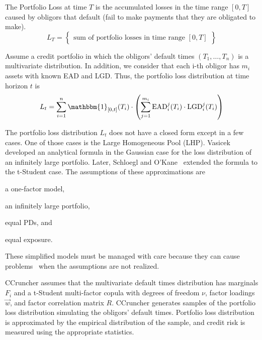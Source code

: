 \documentclass[11pt,fleqn]{book} %
\begin{document}
\begin{definition}
	The Portfolio Loss at time $T$ is the accumulated losses in the time 
	range $[0,T]$ caused by obligors that default (fail to make payments 
	that they are obligated to make).
	\begin{displaymath}
		L_T = \left\{
		\begin{array}{c}
			\text{sum of portfolio losses in time range $[0,T]$}
		\end{array}
		\right\}
	\end{displaymath}
\end{definition}

Assume a credit portfolio in which the obligors' default times 
$(T_1,\dots,T_n)$ is a multivariate distribution. In addition, we consider 
that each i-th obligor has $m_i$ assets with known EAD and LGD\@. Thus, 
the portfolio loss distribution at time horizon $t$ is
\begin{displaymath}
	L_t = \displaystyle \sum_{i=1}^n \mathbbm{1}_{[0,t]}(T_i) \cdot 
	\left( 
	\sum_{j=1}^{m_i} \text{EAD}_i^j(T_i) \cdot \text{LGD}_i^j(T_i)
	\right)
\end{displaymath}

The portfolio loss distribution $L_t$ does not have a closed form except 
in a few cases. One of those cases is the Large Homogeneous Pool (LHP).
Vasicek~\cite{vasicek:1987} developed an analytical formula in the Gaussian 
case for the loss distribution of an infinitely large portfolio. Later, 
Schloegl and O'Kane~\cite{schloegl:2005} extended the formula to the 
t-Student case. The assumptions of these approximations are 
\begin{inparaenum}[1)]
	\item a one-factor model, 
	\item an infinitely large portfolio, 
	\item equal PDs, and
	\item equal exposure.
\end{inparaenum}
These simplified models must be managed with care because they can cause 
problems~\cite{long:2012} when the assumptions are not realized.

CCruncher assumes that the multivariate default times distribution has
marginals $F_i$ and a t-Student multi-factor copula with degrees 
of freedom $\nu$, factor loadings $\vec{w}$, and factor correlation matrix 
$R$. CCruncher generates samples of the portfolio loss distribution simulating 
the obligors' default times. Portfolio loss distribution is approximated by the 
empirical distribution of the sample, and credit risk is measured using the 
appropriate statistics.
\end{document}
